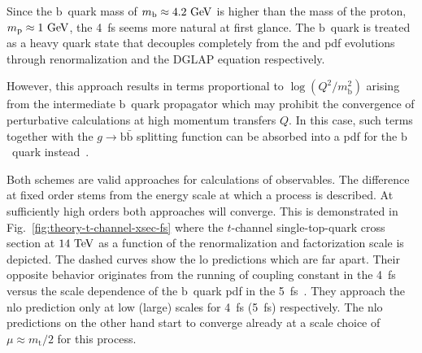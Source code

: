 Since the $\mathrm{b}$~quark mass of $m_\mathrm{b}\approx4.2~\mathrm{GeV}$ is higher than the mass of the proton, $m_\mathrm{p}\approx1~\mathrm{GeV}$, the 4~\gls{fs} seems more natural at first glance. The $\mathrm{b}$~quark is treated as a heavy quark state that decouples completely from the \as and \gls{pdf} evolutions through renormalization and the DGLAP equation respectively.

However, this approach results in terms proportional to $\log(Q^2/m_\mathrm{b}^2)$ arising from the intermediate $\mathrm{b}$~quark propagator which may prohibit the convergence of perturbative calculations at high momentum transfers $Q$. In this case, such terms together with the $g\to\mathrm{b}\bar{\mathrm{b}}$ splitting function can be absorbed into a \gls{pdf} for the $\mathrm{b}$~quark instead~\cite{Maltoni:2012pa}.

Both schemes are valid approaches for calculations of observables. The difference at fixed order stems from the energy scale at which a process is described. At sufficiently high orders both approaches will converge. This is demonstrated in Fig.~\ref{fig:theory-t-channel-xsec-fs} where the $t$-channel single-top-quark cross section at $14~\mathrm{TeV}$ as a function of the renormalization and factorization scale is depicted. The dashed curves show the \gls{lo} predictions which are far apart. Their opposite behavior originates from the running of coupling constant \as in the 4~\gls{fs} versus the scale dependence of the $\mathrm{b}$~quark \gls{pdf} in the 5~\gls{fs}~\cite{Maltoni:2012pa}. They approach the \gls{nlo} prediction only at low (large) scales for 4~\gls{fs} (5~\gls{fs}) respectively. The \gls{nlo} predictions on the other hand start to converge already at a scale choice of $\mu\approx m_\mathrm{t}/2$ for this process.


